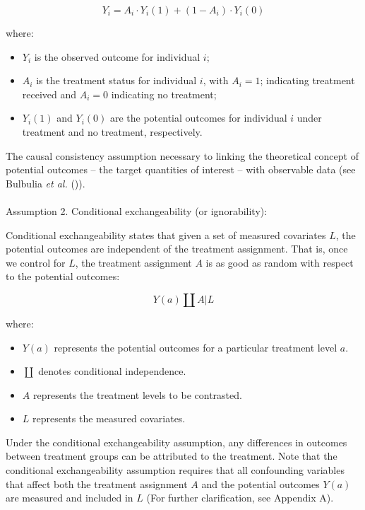 \documentclass[
  single column]{article}
\makeatletter
\let\oldparagraph\paragraph
\renewcommand{\paragraph}{
    \@ifstar
      \xxxParagraphStar
      \xxxParagraphNoStar
  }
\newcommand{\xxxParagraphStar}[1]{\oldparagraph*{#1}\mbox{}}
\newcommand{\xxxParagraphNoStar}[1]{\oldparagraph{#1}\mbox{}}
\providecommand{\tightlist}{%
  \setlength{\itemsep}{0pt}\setlength{\parskip}{0pt}}\usepackage{longtable,booktabs,array}
\makeatother
\begin{document}
\[
Y_i = A_i \cdot Y_i(1) + (1 - A_i) \cdot Y_i(0)
\]

where:

\begin{itemize}
\tightlist
\item
  \(Y_i\) is the observed outcome for individual \(i\);
\item
  \(A_i\) is the treatment status for individual \(i\), with
  \(A_i = 1\); indicating treatment received and \(A_i = 0\) indicating
  no treatment;
\item
  \(Y_i(1)\) and \(Y_i(0)\) are the potential outcomes for individual
  \(i\) under treatment and no treatment, respectively.
\end{itemize}

The causal consistency assumption necessary to linking the theoretical
concept of potential outcomes -- the target quantities of interest --
with observable data (see Bulbulia \emph{et al.}
()).

\paragraph{Assumption 2. Conditional exchangeability (or
ignorability):}\label{assumption-2.-conditional-exchangeability-or-ignorability}

Conditional exchangeability states that given a set of measured
covariates \(L\), the potential outcomes are independent of the
treatment assignment. That is, once we control for \(L\), the treatment
assignment \(A\) is as good as random with respect to the potential
outcomes:

\[
Y(a) \coprod A | L
\]

where:

\begin{itemize}
\tightlist
\item
  \(Y(a)\) represents the potential outcomes for a particular treatment
  level \(a\).
\item
  \(\coprod\) denotes conditional independence.
\item
  \(A\) represents the treatment levels to be contrasted.
\item
  \(L\) represents the measured covariates.
\end{itemize}

Under the conditional exchangeability assumption, any differences in
outcomes between treatment groups can be attributed to the treatment.
Note that the conditional exchangeability assumption requires that all
confounding variables that affect both the treatment assignment \(A\)
and the potential outcomes \(Y(a)\) are measured and included in \(L\)
(For further clarification, see Appendix A).
\end{document}
